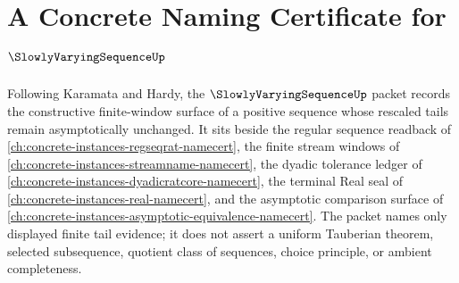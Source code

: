 \chapter{A Concrete Naming Certificate for $\SlowlyVaryingSequenceUp$}
\label{ch:concrete-instances-slowly-varying-sequence-namecert}

Following Karamata and Hardy, the $\SlowlyVaryingSequenceUp$ packet records the constructive finite-window surface of a positive sequence whose rescaled tails remain asymptotically unchanged. It sits beside the regular sequence readback of \autoref{ch:concrete-instances-regseqrat-namecert}, the finite stream windows of \autoref{ch:concrete-instances-streamname-namecert}, the dyadic tolerance ledger of \autoref{ch:concrete-instances-dyadicratcore-namecert}, the terminal Real seal of \autoref{ch:concrete-instances-real-namecert}, and the asymptotic comparison surface of \autoref{ch:concrete-instances-asymptotic-equivalence-namecert}. The packet names only displayed finite tail evidence; it does not assert a uniform Tauberian theorem, selected subsequence, quotient class of sequences, choice principle, or ambient completeness.

